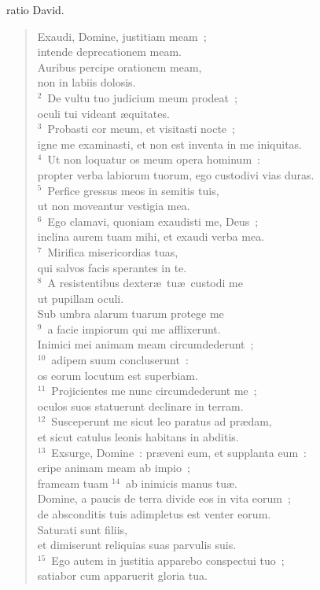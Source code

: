 \bchapter
{}ratio David. \begin{flushleft}\begin{verse}\vspace{6pt}Exaudi, Domine, justitiam meam~;\\ intende deprecationem meam.\\ Auribus percipe orationem meam,\\ non in labiis dolosis.\\
${}^{2}$~De vultu tuo judicium meum prodeat~;\\ oculi tui videant \ae quitates.\\
${}^{3}$~Probasti cor meum, et visitasti nocte~;\\ igne me examinasti, et non est inventa in me iniquitas.\\
${}^{4}$~Ut non loquatur os meum opera hominum~:\\ propter verba labiorum tuorum, ego custodivi vias duras.\\
${}^{5}$~Perfice gressus meos in semitis tuis,\\ ut non moveantur vestigia mea.\\
${}^{6}$~Ego clamavi, quoniam exaudisti me, Deus~;\\ inclina aurem tuam mihi, et exaudi verba mea.\\
${}^{7}$~Mirifica misericordias tuas,\\ qui salvos facis sperantes in te.\\
${}^{8}$~A resistentibus dexter\ae\ tu\ae\ custodi me\\ ut pupillam oculi.\\ Sub umbra alarum tuarum protege me\\
${}^{9}$~a facie impiorum qui me afflixerunt.\\ Inimici mei animam meam circumdederunt~;\\
${}^{10}$~adipem suum concluserunt~:\\ os eorum locutum est superbiam.\\
${}^{11}$~Projicientes me nunc circumdederunt me~;\\ oculos suos statuerunt declinare in terram.\\
${}^{12}$~Susceperunt me sicut leo paratus ad pr\ae dam,\\ et sicut catulus leonis habitans in abditis.\\
${}^{13}$~Exsurge, Domine~: pr\ae veni eum, et supplanta eum~:\\ eripe animam meam ab impio~;\\ frameam tuam
${}^{14}$~ab inimicis manus tu\ae .\\ Domine, a paucis de terra divide eos in vita eorum~;\\ de absconditis tuis adimpletus est venter eorum.\\ Saturati sunt filiis,\\ et dimiserunt reliquias suas parvulis suis.\\
${}^{15}$~Ego autem in justitia apparebo conspectui tuo~;\\ satiabor cum apparuerit gloria tua.\end{verse}\end{flushleft}



